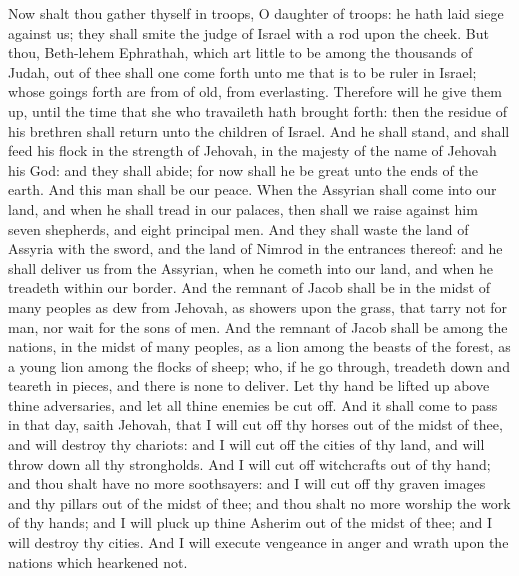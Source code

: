 Now shalt thou gather thyself in troops, O daughter of troops: he hath laid siege against us; they shall smite the judge of Israel with a rod upon the cheek.  But thou, Beth-lehem Ephrathah, which art little to be among the thousands of Judah, out of thee shall one come forth unto me that is to be ruler in Israel; whose goings forth are from of old, from everlasting. Therefore will he give them up, until the time that she who travaileth hath brought forth: then the residue of his brethren shall return unto the children of Israel. And he shall stand, and shall feed his flock in the strength of Jehovah, in the majesty of the name of Jehovah his God: and they shall abide; for now shall he be great unto the ends of the earth. And this man shall be our peace. When the Assyrian shall come into our land, and when he shall tread in our palaces, then shall we raise against him seven shepherds, and eight principal men. And they shall waste the land of Assyria with the sword, and the land of Nimrod in the entrances thereof: and he shall deliver us from the Assyrian, when he cometh into our land, and when he treadeth within our border. And the remnant of Jacob shall be in the midst of many peoples as dew from Jehovah, as showers upon the grass, that tarry not for man, nor wait for the sons of men. And the remnant of Jacob shall be among the nations, in the midst of many peoples, as a lion among the beasts of the forest, as a young lion among the flocks of sheep; who, if he go through, treadeth down and teareth in pieces, and there is none to deliver. Let thy hand be lifted up above thine adversaries, and let all thine enemies be cut off.  And it shall come to pass in that day, saith Jehovah, that I will cut off thy horses out of the midst of thee, and will destroy thy chariots: and I will cut off the cities of thy land, and will throw down all thy strongholds. And I will cut off witchcrafts out of thy hand; and thou shalt have no more soothsayers: and I will cut off thy graven images and thy pillars out of the midst of thee; and thou shalt no more worship the work of thy hands; and I will pluck up thine Asherim out of the midst of thee; and I will destroy thy cities. And I will execute vengeance in anger and wrath upon the nations which hearkened not. 

